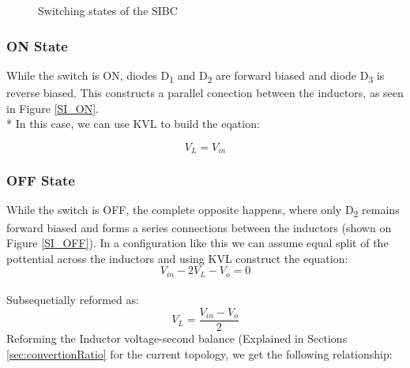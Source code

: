 \begin{figure}[H]%
    \centering
    \qquad
    \caption{Switching states of the SIBC}%
     \label{fig:SI_States}%
\end{figure}

\subsubsection{ON State}
While the switch is ON, diodes D\textsubscript{1} and D\textsubscript{2} are forward biased and diode D\textsubscript{3} is reverse biased.
This constructs a parallel conection between the inductors, as seen in Figure \ref{SI_ON}.
\\*
In this case, we can use KVL to build the eqation: 

\begin{equation}
	V_L=V_{in}
	\label{eq:SI_KVL_ON}
\end{equation}

\subsubsection{OFF State}
While the switch is OFF, the complete opposite happens, where only D\textsubscript{2} remains forward biased and forms a series connections between the inductors (shown on Figure \ref{SI_OFF}).
In a configuration like this we can assume equal split of the pottential across the inductors and using KVL construct the equation:
\begin{equation}
	V_{in}-2V_L-V_o=0
	\label{eq:SI_KVL_OFF}
\end{equation}\\
Subsequetially reformed as:
\begin{equation}
	V_L=\frac{V_{in} - V_o}{2}
	\label{eq:SI_KVL_OFF2}
\end{equation}
Reforming the Inductor voltage-second balance (Explained in Sections \ref{sec:convertionRatio} for the current topology, we get the following relationship:

